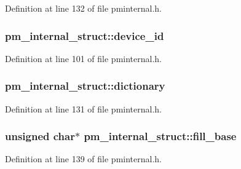 Definition at line 132 of file pminternal.\+h.

\subsubsection[{\texorpdfstring{device\+\_\+id}{device_id}}]{ pm\+\_\+internal\+\_\+struct\+::device\+\_\+id}\hypertarget{structpm__internal__struct_a6434c3e3e21fad6289c32c480e13edd5}{}\label{structpm__internal__struct_a6434c3e3e21fad6289c32c480e13edd5}


Definition at line 101 of file pminternal.\+h.

\subsubsection[{\texorpdfstring{dictionary}{dictionary}}]{ pm\+\_\+internal\+\_\+struct\+::dictionary}\hypertarget{structpm__internal__struct_a0674a7a8d17ca8d00df7ac6594b01f17}{}\label{structpm__internal__struct_a0674a7a8d17ca8d00df7ac6594b01f17}


Definition at line 131 of file pminternal.\+h.

\subsubsection[{\texorpdfstring{fill\+\_\+base}{fill_base}}]{\setlength{\rightskip}{0pt plus 5cm}unsigned char$\ast$ pm\+\_\+internal\+\_\+struct\+::fill\+\_\+base}\hypertarget{structpm__internal__struct_ad789ea60604e466b9de67da9e6cbe1e9}{}\label{structpm__internal__struct_ad789ea60604e466b9de67da9e6cbe1e9}


Definition at line 139 of file pminternal.\+h.

